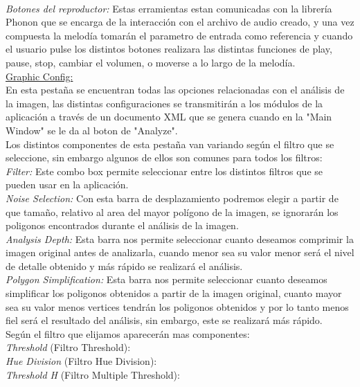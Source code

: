 \\\textit{Botones del reproductor:} Estas erramientas estan comunicadas con la librería Phonon que se encarga de la interacción con el archivo de audio creado, y una vez compuesta la melodía tomarán el parametro de entrada como referencia y cuando el usuario pulse los distintos botones realizara las distintas funciones de play, pause, stop, cambiar el volumen, o moverse a lo largo de la melodía.
\newline
\\\underline{Graphic Config:}
\\En esta pestaña se encuentran todas las opciones relacionadas con el análisis de la imagen, las distintas configuraciones se transmitirán a los módulos de la aplicación a través de un documento XML que se genera cuando en la "Main Window" se le da al boton de "Analyze".
\\Los distintos componentes de esta pestaña van variando según el filtro que se seleccione, sin embargo algunos de ellos son comunes para todos los filtros:
\newline
\\\textit{Filter:} Este combo box permite seleccionar entre los distintos filtros que se pueden usar en la aplicación.
\\\textit{Noise Selection:} Con esta barra de desplazamiento podremos elegir a partir de que tamaño, relativo al area del mayor polígono de la imagen, se ignorarán los poligonos encontrados durante el análisis de la imagen.
\\\textit{Analysis Depth:} Esta barra nos permite seleccionar cuanto deseamos comprimir la imagen original antes de analizarla, cuando menor sea su valor menor será el nivel de detalle obtenido y más rápido se realizará el análisis.
\\\textit{Polygon Simplification:} Esta barra nos permite seleccionar cuanto deseamos simplificar los poligonos obtenidos a partir de la imagen original, cuanto mayor sea su valor menos vertices tendrán los poligonos obtenidos y por lo tanto menos fiel será el resultado del análisis, sin embargo, este se realizará más rápido.
\newline
\\Según el filtro que elijamos aparecerán mas componentes:
\newline
\\\textit{Threshold} (Filtro Threshold): 
\\\textit{Hue Division} (Filtro Hue Division):
\\\textit{Threshold H} (Filtro Multiple Threshold):
